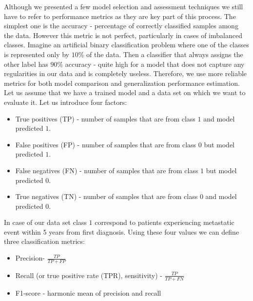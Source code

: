 \documentclass[shortabstract, english, mgr]{iithesis}
\begin{document}
Although we presented a few model selection and assessment techniques we still have to refer to performance metrics as they are key part of this process. The simplest one is the accuracy - percentage of correctly classified samples among the data. However this metric is not perfect, particularly in cases of imbalanced classes. Imagine an artificial binary classification problem where one of the classes is represented only by $10\%$ of the data. Then a classifier that always assigns the other label has $90\%$ accuracy - quite high for a model that does not capture any regularities in our data and is completely useless. Therefore, we use more reliable metrics for both model comparison and generalization performance estimation. Let us assume that we have a trained model and a data set on which we want to evaluate it. Let us introduce four factors:
\begin{itemize}
    \item True positives (TP) - number of samples that are from class $1$ and model predicted $1$.
    \item False positives (FP) - number of samples that are from class $0$ but model predicted $1$.
    \item False negatives (FN) - number of samples that are from class $1$ but model predicted $0$.
    \item True negatives (TN) - number of samples that are from class $0$ and model predicted $0$. 
\end{itemize}
In case of our data set class $1$ correspond to patients experiencing metastatic event within 5 years from first diagnosis. Using these four values we can define three classification metrics:
\begin{itemize}
    \item Precision- $\frac{TP}{TP + FP}$
    \item Recall (or true positive rate (TPR), sensitivity) - $\frac{TP}{TP + FN}$
    \item F1-score - harmonic mean of precision and recall
\end{itemize}
\end{document}

